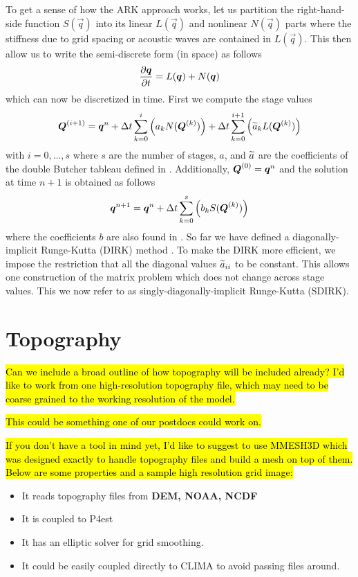 \documentclass{article}
\begin{document}
To get a sense of how the ARK approach works, let us partition the right-hand-side function $S(\vec{q})$ into its linear $L(\vec{q})$ and nonlinear $N(\vec{q})$ parts where the stiffness due to grid spacing or acoustic waves are contained in $L(\vec{q})$.  This then allow us to write the semi-discrete form (in space) as follows
\[
\frac{\partial \boldsymbol{{q}}}{\partial t} = L(\boldsymbol{{q}}) + N(\boldsymbol{{q}}) 
\]
which can now be discretized in time.  First we compute the stage values
\[
\boldsymbol{{Q}}^{(i+1)}=\boldsymbol{{q}}^n + \Delta t \sum_{k=0}^{i} \left( a_k N(\boldsymbol{{Q}}^{(k)}) \right) + \Delta t \sum_{k=0}^{i+1} \left( \widetilde{a}_k L(\boldsymbol{{Q}}^{(k)}) \right)
\]
with $i=0,\ldots,s$ where $s$ are the number of stages, $a$, and $\widetilde{a}$ are the coefficients of the double Butcher tableau defined in \citet{kennedy:2003,giraldo:2013}.  Additionally, 
$\boldsymbol{{Q}}^{(0)}=\boldsymbol{{q}}^n$ and the solution at time $n+1$ is obtained as follows
\[
\boldsymbol{{q}}^{n+1}=\boldsymbol{{q}}^n + \Delta t \sum_{k=0}^{s} \left( b_k S(\boldsymbol{{Q}}^{(k)}) \right)
\]
where the coefficients $b$ are also found in \citet{kennedy:2003,giraldo:2013}.
So far we have defined a diagonally-implicit Runge-Kutta (DIRK) method \citep{alexander:1977,butcher:1981a,ascher:1997,boscarino:2009}.  To make the DIRK more efficient, we impose the restriction that all the diagonal values $\widetilde{a}_{ii}$ to be constant. This allows one construction of the matrix problem which does not change across stage values.  This we now refer to as singly-diagonally-implicit Runge-Kutta (SDIRK).

\section{Topography}

\hl{Can we include a broad outline of how topography will be included already? I'd like to work from one high-resolution topography file, which may need to be coarse grained to the working resolution of the model.}

\hl{This could be something one of our postdocs could work on.}

\hl{If you don't have a tool in mind yet, I'd like to suggest to use MMESH3D which was designed exactly to handle topography files and build a mesh on top of them.
Below are some properties and a sample high resolution grid image:
}
\begin{itemize}
    \item It reads topography files from {\bf DEM, NOAA, NCDF}
    \item It is coupled to P4est
    \item It has an elliptic solver for grid smoothing.
    \item It could be easily coupled directly to CLIMA to avoid passing files around.
\end{itemize}
\end{document}

